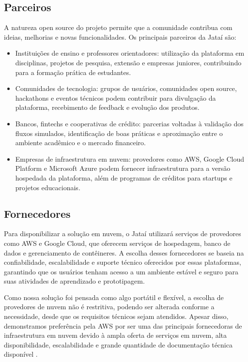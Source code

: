 \documentclass[
  12pt,
  openright,
  oneside,
  a4paper,
  brazilian
]{abntex2}
\begin{document}
\subsection{Parceiros}
A natureza open source do projeto permite que a comunidade contribua com ideias, melhorias e novas funcionalidades. Os principais parceiros da Jataí são:

\begin{itemize}
    \item{Instituições de ensino e professores orientadores}: utilização da plataforma em disciplinas, projetos de pesquisa, extensão e empresas juniores, contribuindo para a formação prática de estudantes.
    
    \item{Comunidades de tecnologia}: grupos de usuários, comunidades open source, hackathons e eventos técnicos podem contribuir para divulgação da plataforma, recebimento de feedback e evolução dos produtos.
    
    \item{Bancos, fintechs e cooperativas de crédito}: parcerias voltadas à validação dos fluxos simulados, identificação de boas práticas e aproximação entre o ambiente acadêmico e o mercado financeiro.
    
    \item{Empresas de infraestrutura em nuvem}: provedores como AWS, Google Cloud Platform e Microsoft Azure podem fornecer infraestrutura para a versão hospedada da plataforma, além de programas de créditos para startups e projetos educacionais.
\end{itemize}

\subsection{Fornecedores}
Para disponibilizar a solução em nuvem, o Jataí utilizará serviços de provedores como AWS e Google Cloud, que oferecem serviços de hospedagem, banco de dados e gerenciamento de contêineres. A escolha desses fornecedores se baseia na confiabilidade, escalabilidade e suporte técnico oferecidos por essas plataformas, garantindo que os usuários tenham acesso a um ambiente estável e seguro para suas atividades de aprendizado e prototipagem.

Como nossa solução foi pensada como algo portátil e flexível, a escolha de provedores de nuvem não é restritiva, podendo ser alterada conforme a necessidade, desde que os requisitos técnicos sejam atendidos. Apesar disso, demonstramos preferência pela AWS por ser uma das principais fornecedoras de infraestrutura em nuvem devido à ampla oferta de serviços em nuvem, alta disponibilidade, escalabilidade e grande quantidade de documentação técnica disponível \parencite{awsDoc}.
\end{document}
